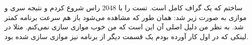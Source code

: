 ساختم که یک گراف کامل است. تست را با 2048 راس شروع کردم و نتیجه سری و موازی به صورت زیر شد:
همان طور که مشاهده می‌شود باز هم سرعت برنامه کمتر شد. به نظر من دلیل اصلی آن این است که من خوب
موازی سازی ‌نمی‌کنم. مثلا در لینکی که در اول کار آورده بودم یک قسمت دیگر از برنامه نیز موازی سازی
شده بود.